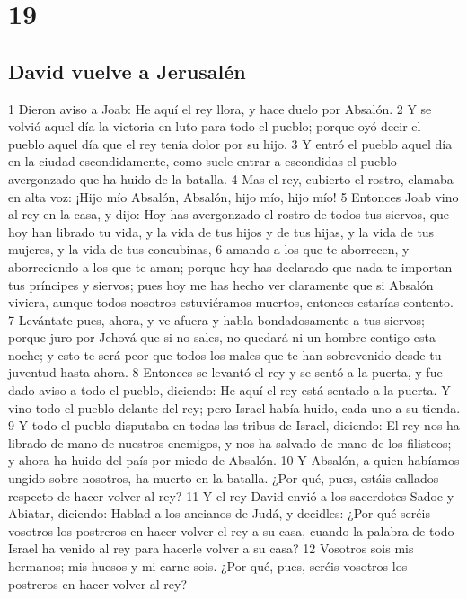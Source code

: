 \chapter{19}

\section*{David vuelve a Jerusalén}

1 Dieron aviso a Joab: He aquí el rey llora, y hace duelo por Absalón.
2 Y se volvió aquel día la victoria en luto para todo el pueblo; porque oyó decir el pueblo aquel día que el rey tenía dolor por su hijo.
3 Y entró el pueblo aquel día en la ciudad escondidamente, como suele entrar a escondidas el pueblo avergonzado que ha huido de la batalla.
4 Mas el rey, cubierto el rostro, clamaba en alta voz: ¡Hijo mío Absalón, Absalón, hijo mío, hijo mío!
5 Entonces Joab vino al rey en la casa, y dijo: Hoy has avergonzado el rostro de todos tus siervos, que hoy han librado tu vida, y la vida de tus hijos y de tus hijas, y la vida de tus mujeres, y la vida de tus concubinas,
6 amando a los que te aborrecen, y aborreciendo a los que te aman; porque hoy has declarado que nada te importan tus príncipes y siervos; pues hoy me has hecho ver claramente que si Absalón viviera, aunque todos nosotros estuviéramos muertos, entonces estarías contento.
7 Levántate pues, ahora, y ve afuera y habla bondadosamente a tus siervos; porque juro por Jehová que si no sales, no quedará ni un hombre contigo esta noche; y esto te será peor que todos los males que te han sobrevenido desde tu juventud hasta ahora.
8 Entonces se levantó el rey y se sentó a la puerta, y fue dado aviso a todo el pueblo, diciendo: He aquí el rey está sentado a la puerta. Y vino todo el pueblo delante del rey; pero Israel había huido, cada uno a su tienda.
9 Y todo el pueblo disputaba en todas las tribus de Israel, diciendo: El rey nos ha librado de mano de nuestros enemigos, y nos ha salvado de mano de los filisteos; y ahora ha huido del país por miedo de Absalón.
10 Y Absalón, a quien habíamos ungido sobre nosotros, ha muerto en la batalla. ¿Por qué, pues, estáis callados respecto de hacer volver al rey? 
11 Y el rey David envió a los sacerdotes Sadoc y Abiatar, diciendo: Hablad a los ancianos de Judá, y decidles: ¿Por qué seréis vosotros los postreros en hacer volver el rey a su casa, cuando la palabra de todo Israel ha venido al rey para hacerle volver a su casa?
12 Vosotros sois mis hermanos; mis huesos y mi carne sois. ¿Por qué, pues, seréis vosotros los postreros en hacer volver al rey?
